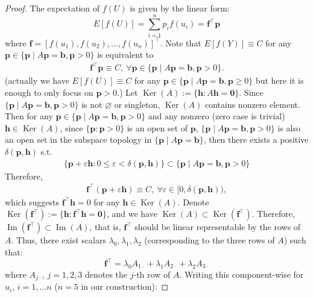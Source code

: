 \documentclass[11pt]{article}
\theoremstyle{referenceplain}
\theoremstyle{referencedefinition}
\theoremstyle{referenceremark}
\begin{document}
\begin{proof}
The expectation of $f(U)$ is given by the linear form:
$$ E[f(U)] = \sum_{i=1}^n p_i f(u_i) = \mathbf{f}^\top \mathbf{p} $$
where $\mathbf{f} = [f(u_1), f(u_2), \dots, f(u_n)]^\top$.
Note that $E[f(Y)]\equiv C$ for any  $\mathbf{p}\in\{\mathbf{p} \mid A \mathbf{p}=\mathbf{b}, \mathbf{p} > 0\}$ is equivalent to
\begin{align}
    \mathbf{f}^\top \mathbf{p}\equiv C,~\forall \mathbf{p}\in\{\mathbf{p} \mid A \mathbf{p}=\mathbf{b}, \mathbf{p} > 0\}.
\end{align}
(actually we have $E[f(U)]\equiv C$ for any  $\mathbf{p}\in\{\mathbf{p} \mid A \mathbf{p}=\mathbf{b}, \mathbf{p} \ge 0\}$ but here it is enough to only focus on $\mathbf{p} > 0$.) Let $\operatorname{Ker}(A):=\{\mathbf{h}: A\mathbf{h}=\mathbf{0}\}$. Since $\{\mathbf{p} \mid A \mathbf{p}=\mathbf{b}, \mathbf{p} > 0\}$ is not $\varnothing$ or singleton, $\operatorname{Ker}(A)$ contains nonzero element. Then for any $\mathbf{p}\in\{\mathbf{p} \mid A \mathbf{p}=\mathbf{b}, \mathbf{p} > 0\} $ and any nonzero (zero case is trivial) $\mathbf{h}\in \operatorname{Ker}(A)$, since $\{\mathbf{p}:\mathbf{p}>0\}$ is an open set of $\mathbf{p}$, $\{\mathbf{p} \mid A \mathbf{p}=\mathbf{b}, \mathbf{p} > 0\}$ is also an open set in the subspace topology in $\{\mathbf{p} \mid A \mathbf{p}=\mathbf{b}\}$, then there exists a positive $\delta(\mathbf{p},\mathbf{h})$ s.t. 
\begin{align}
    \{\mathbf{p}+\varepsilon\mathbf{h}:0\leq\varepsilon<\delta(\mathbf{p},\mathbf{h})\}\subset\{\mathbf{p} \mid A \mathbf{p}=\mathbf{b}, \mathbf{p} > 0\}
\end{align}
Therefore, 
\begin{align}
    \mathbf{f}^\top (\mathbf{p}+\varepsilon\mathbf{h})\equiv C, ~\forall\varepsilon\in[0,\delta(\mathbf{p},\mathbf{h})),
\end{align}
which suggests $\mathbf{f}^\top\mathbf{h}=0$ for any  $\mathbf{h}\in \operatorname{Ker}(A)$. Denote $\operatorname{Ker}(\mathbf{f}^\top):=\{\mathbf{h}: \mathbf{f}^\top\mathbf{h}=\mathbf{0}\}$, and we have $\operatorname{Ker}(A)\subset\operatorname{Ker}(\mathbf{f}^\top)$. Therefore, $\operatorname{Im}(\mathbf{f}^\top)\subset \operatorname{Im}(A)$, that is,  $\mathbf{f}^\top$ should be linear representable by the rows of $A$. Thus, there exist scalars $\lambda_0, \lambda_1, \lambda_2$ (corresponding to the three rows of $A$) such that:
$$ \mathbf{f}^\top = \lambda_0 A_{1\cdot} + \lambda_1 A_{2\cdot} + \lambda_2 A_{3\cdot} $$
where $A_{j\cdot}$, $j=1,2,3$ denotes the $j$-th row of $A$. Writing this component-wise for $u_i$, $i=1,\dots n$ ($n=5$ in our construction):

\end{proof}
\end{document}
